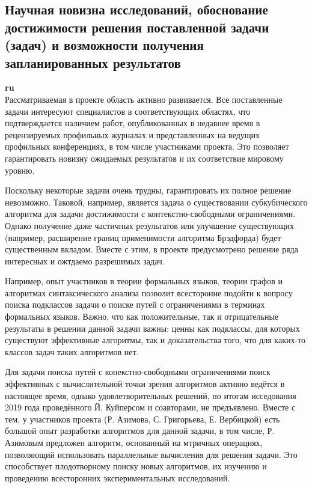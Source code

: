 \documentclass[12pt]{article}  %
\theoremstyle{remark}
\begin{document}
\subsection{Научная новизна исследований, обоснование достижимости решения поставленной задачи (задач) и возможности получения запланированных результатов}

\textbf{ru}\\
%
Рассматриваемая в проекте область активно развивается. Все поставленные задачи интересуют специалистов в соответствующих областях, что подтверждается наличием работ, опубликованных в недавнее время в рецензируемых профильных журналах и представленных на ведущих профильных конференциях, в том числе участниками проекта. Это позволяет гарантировать новизну ожидаемых результатов и их соответствие мировому уровню.

Поскольку некоторые задачи очень трудны, гарантировать их полное решение невозможно. Таковой, например, является задача о существовании субкубического алгоритма для задачи достижимости с контекстно-свободными ограничениями. Однако получение даже частичных результатов или улучшение существующих (например, расширение границ применимости алгоритма Брэдфорда) будет существенным вкладом. Вместе с этим, в проекте предусмотрено решение ряда интересных и ожтдаемо разрешимых задач.

Например, опыт участников в теории формальных языков, теории графов и алгоритмах синтаксического анализа позволит всесторонне подойти к вопросу поиска подклассов задачи о поиске путей с ограничениями в терминах формальных языков. Важно, что как положительные, так и отрицательные результаты в решении данной задачи важны: ценны как подклассы, для которых существуют эффективные алгоритмы, так и доказательства того, что для каких-то классов задач таких алгоритмов нет.

Для задачи поиска путей с конекстно-свободными ограничениями поиск эффективных с вычислительной точки зрения алгоритмов активно ведётся в настоящее время, однако удовлетворительных решений, по итогам исседования 2019 года проведённого Й. Куйперсом и соавторами, не предъявлено.
Вместе с тем, у участников проекта (Р. Азимова, С. Григорьева, Е. Вербицкой) есть большой опыт разработки алгоритмов для данной задачи, в том числе, Р. Азимовым предложен алгоритм, основанный на мтричных операциях, позволяющий использовать параллельные вычисления для решения задачи. Это способствует плодотворному поиску новых алгоритмов, их изучению и проведению всесторонних экспериментальных исследований.
\end{document}
